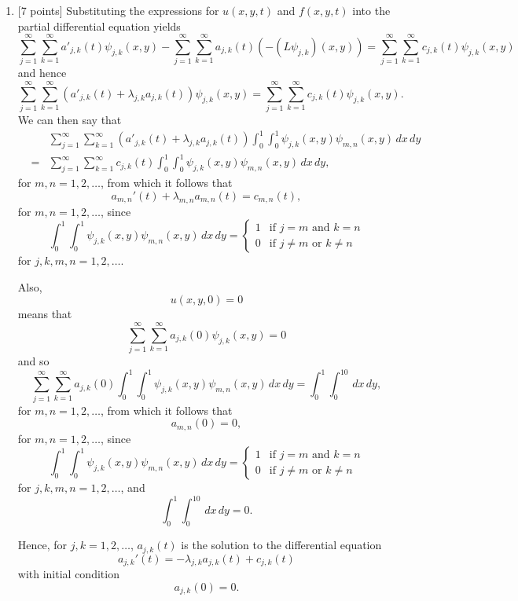 \begin{solution}
\begin{enumerate}
\item {[7 points]} Substituting the expressions for $u(x,y,t)$ and $f(x,y,t)$ into the partial differential equation yields
\[
\sum_{j=1}^\infty \sum_{k=1}^\infty a'_{j,k}(t) \psi_{j,k} (x,y)-\sum_{j=1}^\infty \sum_{k=1}^\infty a_{j,k}(t) \left(-\left(L\psi_{j,k}\right) (x,y)\right)=\sum_{j=1}^\infty \sum_{k=1}^\infty c_{j,k}(t) \psi_{j,k} (x,y)
\]
and hence
\[
\sum_{j=1}^\infty \sum_{k=1}^\infty \left(a'_{j,k}(t)+\lambda_{j,k}a_{j,k}(t)\right)\psi_{j,k} (x,y)=\sum_{j=1}^\infty \sum_{k=1}^\infty c_{j,k}(t) \psi_{j,k} (x,y).
\]
We can then say that
\begin{eqnarray*}
&&\sum_{j=1}^\infty \sum_{k=1}^\infty \left(a'_{j,k}(t)+\lambda_{j,k}a_{j,k}(t)\right)\int_0^1\int_0^1\psi_{j,k} (x,y)\psi_{m,n} (x,y)\,dx\,dy
\\
&=&\sum_{j=1}^\infty \sum_{k=1}^\infty c_{j,k}(t) \int_0^1\int_0^1\psi_{j,k} (x,y)\psi_{m,n} (x,y)\,dx\,dy,
\end{eqnarray*}
for $m,n=1,2,\ldots$, from which it follows that
\[
a_{m,n}'(t)+\lambda_{m,n} a_{m,n}(t)=c_{m,n}(t),
\]
for $m,n=1,2,\ldots$, since
\[
\int_0^1\int_0^1\psi_{j,k} (x,y)\psi_{m,n} (x,y)\,dx\,dy = \left\{\begin{array}{ll} 1 & \mbox{if }j=m\mbox{ and }k=n \\ 0 & \mbox{if }j\ne m\mbox{ or }k\ne n \end{array}\right.
\]
for $j,k,m,n=1,2,\ldots$.

Also,
\[
u(x,y,0)=0
\]
means that
\[
\sum_{j=1}^\infty \sum_{k=1}^\infty a_{j,k}(0) \psi_{j,k} (x,y)=0
\]
and so
\[
\sum_{j=1}^\infty \sum_{k=1}^\infty a_{j,k}(0) \int_0^1\int_0^1\psi_{j,k} (x,y)\psi_{m,n} (x,y)\,dx\,dy=\int_0^1\int_0^10\,dx\,dy,
\]
for $m,n=1,2,\ldots$, from which it follows that
\[
a_{m,n}(0)=0,
\]
for $m,n=1,2,\ldots$, since
\[
\int_0^1\int_0^1\psi_{j,k} (x,y)\psi_{m,n} (x,y)\,dx\,dy = \left\{\begin{array}{ll} 1 & \mbox{if }j=m\mbox{ and }k=n \\ 0 & \mbox{if }j\ne m\mbox{ or }k\ne n \end{array}\right.
\]
for $j,k,m,n=1,2,\ldots$, and
\[
\int_0^1\int_0^10\,dx\,dy=0.
\]

Hence, for $j,k=1,2,\ldots$, $a_{j,k}(t)$ is the solution to the differential equation
\[
a_{j,k}'(t)=-\lambda_{j,k} a_{j,k}(t)+c_{j,k}(t)
\]
with initial condition
\[
a_{j,k}(0)=0.
\]


\end{enumerate}
\end{solution}
